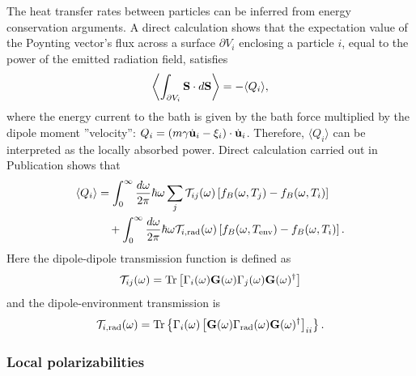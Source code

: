 The heat transfer rates between particles can be inferred from energy conservation arguments. A direct calculation shows that the expectation value of the Poynting vector's flux across a surface $\partial V_i$ enclosing a particle $i$, equal to the power of the emitted radiation field, satisfies 
\begin{equation}
 \left\langle \int_{\partial V_i} \mathbf{S} \cdot d\mathbf{S} \right\rangle = - \langle Q_i \rangle,
\end{equation}
where the energy current to the bath is given by the bath force multiplied by the dipole moment ''velocity'': $Q_i = (m\gamma \dot{\mathbf{u}}_i-\xi_i)\cdot \dot{\mathbf{u}}_i$. Therefore, $\langle Q_i\rangle$ can be interpreted as the locally absorbed power. Direct calculation carried out in Publication  shows that 
\begin{alignat}{2}
 \langle Q_i \rangle &= \int_0^{\infty}\frac{d\omega}{2\pi} \hbar\omega \sum_{j} \mathcal{T}_{ij}(\omega) \left[f_B(\omega,T_j)-f_B(\omega,T_i ) \right] \notag \\
  & \quad + \int_0^{\infty} \frac{d\omega}{2\pi} \hbar \omega \mathcal{T}_{i,\textrm{rad}}(\omega)\left[ f_B(\omega,T_{\textrm{env}})-f_B(\omega,T_i)\right].
\end{alignat}
Here the dipole-dipole transmission function is defined as
\begin{equation}
 \mathcal{T}_{ij}(\omega) = \textrm{Tr} \left[\Gamma_i(\omega) \mathbf{G}(\omega) \Gamma_j(\omega) \mathbf{G}(\omega)^{\dagger} \right]
\end{equation}
and the dipole-environment transmission is 
\begin{equation}
 \mathcal{T}_{i,\textrm{rad}}(\omega) =  \textrm{Tr} \left\{ \Gamma_i(\omega) \left[ \mathbf{G}(\omega) \Gamma_{\textrm{rad}}(\omega) \mathbf{G}(\omega)^{\dagger} \right]_{ii} \right\}.
\end{equation}

\subsubsection{Local polarizabilities}

